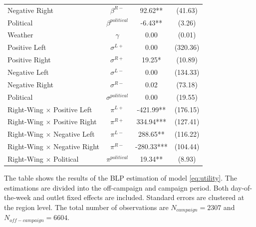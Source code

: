\documentclass[12pt]{article}
\begin{document}
\begin{table}[!htbp]
\begin{threeparttable}
\begin{tabular}{lccc}
				Negative Right & $\beta^{R-}$ & 92.62** & (41.63) \\
				Political & $\beta^{political}$ & -6.43** & (3.26) \\
				Weather & $\gamma$ & 0.00 & (0.01) \\
				\hline
				Positive Left & $\sigma^{L+}$ & 0.00 & (320.36) \\
				Positive Right & $\sigma^{R+}$ & 19.25* & (10.89) \\
				Negative Left & $\sigma^{L-}$ & 0.00 & (134.33) \\
				Negative Right & $\sigma^{R-}$ & 0.02 & (73.18) \\
				Political & $\sigma^{political}$ & 0.00 & (19.55) \\
				\hline
				Right-Wing $\times$  Positive Left & $\pi^{L+}$ & -421.99** & (176.15) \\
				Right-Wing $\times$  Positive Right & $\pi^{R+}$ & 334.94*** & (127.41) \\
				Right-Wing $\times$  Negative Left & $\pi^{L-}$ & 288.65** & (116.22) \\
				Right-Wing $\times$  Negative Right & $\pi^{R-}$ & -280.33*** & (104.44) \\
				Right-Wing $\times$  Political & $\pi^{political}$ & 19.34** & (8.93) \\
				\hline
				\hline
			\end{tabular}

			\begin{tablenotes}
				\small
				\item \footnotesize{The table shows the results of the BLP estimation of model \ref{eq:utility}. The estimations are divided into the off-campaign and campaign period. Both day-of-the-week and outlet fixed effects are included. Standard errors are clustered at the region level. The total number of observations are $N_{campaign}=2307$ and  $N_{off-campaign}=6604$.}
			\end{tablenotes}
		\end{threeparttable}
	\end{table}
	
	

	

	
	

	
	
	
	
\end{document}
